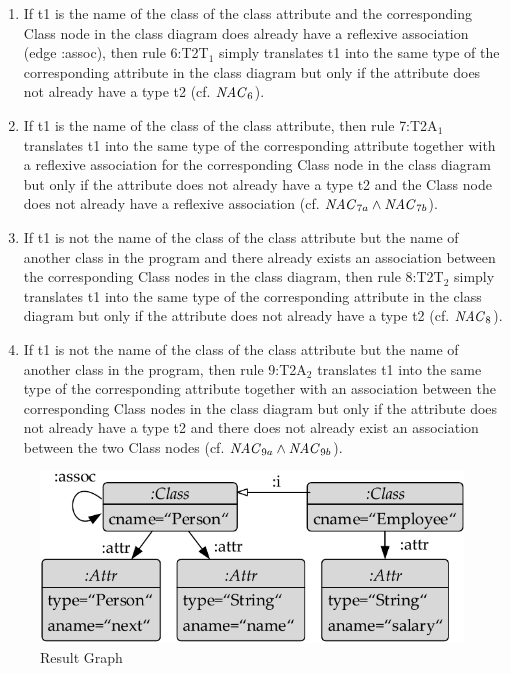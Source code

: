 \begin{example}
\begin{enumerate}
  \begin{enumerate}
    \item If \textsf{t1} is the name of the class of the class attribute and the corresponding \textsf{Class} node in the class diagram does already have a reflexive association (edge \textsf{:assoc}), then rule \textsf{6:T2T}$_1$ simply translates \textsf{t1} into the same type of the corresponding attribute in the class diagram but only if the attribute does not already have a type \textsf{t2} (cf. $\mathit{NAC}_6$).
    \item If \textsf{t1} is the name of the class of the class attribute, then rule \textsf{7:T2A}$_1$ translates \textsf{t1} into the same type of the corresponding attribute together with a reflexive association for the corresponding \textsf{Class} node in the class diagram but only if the attribute does not already have a type \textsf{t2} and the \textsf{Class} node does not already have a reflexive association (cf. $\mathit{NAC}_{7a} \wedge \mathit{NAC}_{7b}$).
    \item If \textsf{t1} is not the name of the class of the class attribute but the name of another class in the program and there already exists an association between the corresponding \textsf{Class} nodes in the class diagram, then rule \textsf{8:T2T}$_2$ simply translates \textsf{t1} into the same type of the corresponding attribute in the class diagram but only if the attribute does not already have a type \textsf{t2} (cf. $\mathit{NAC}_8$).
    \item If \textsf{t1} is not the name of the class of the class attribute but the name of another class in the program, then rule \textsf{9:T2A}$_2$ translates \textsf{t1} into the same type of the corresponding attribute together with an association between the corresponding \textsf{Class} nodes in the class diagram but only if the attribute does not already have a type \textsf{t2} and there does not already exist an association between the two \textsf{Class} nodes (cf. $\mathit{NAC}_{9a} \wedge \mathit{NAC}_{9b}$).
  \end{enumerate}
\end{enumerate}

\begin{figure}[!tb]
\centering
\includegraphics[width=.48\textwidth]{img/software_trans/result.pdf}
\caption{Result Graph}
\label{fig:sec-compl-software-trans:result}
\end{figure}


\end{example}
